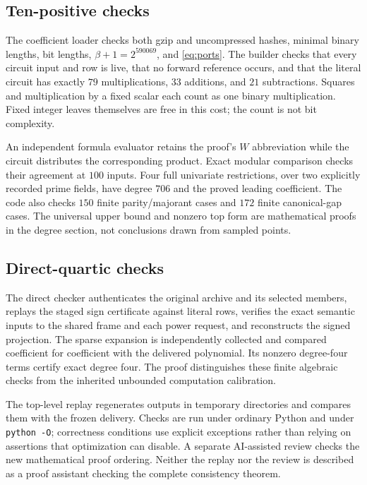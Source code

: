 \documentclass[11pt,letterpaper]{article}
\theoremstyle{definition}
\theoremstyle{remark}
\numberwithin{equation}{section}
\begin{document}
\subsection{Ten-positive checks}

The coefficient loader checks both gzip and uncompressed hashes, minimal
binary lengths, bit lengths, $\beta+1=2^{590069}$, and
\eqref{eq:ports}. The builder checks that every circuit input and row is
live, that no forward reference occurs, and that the literal circuit has
exactly $79$ multiplications, $33$ additions, and $21$ subtractions.
Squares and multiplication by a fixed scalar each count as one binary
multiplication. Fixed integer leaves themselves are free in this cost;
the count is not bit complexity.

An independent formula evaluator retains the proof's $W$ abbreviation
while the circuit distributes the corresponding product. Exact modular
comparison checks their agreement at $100$ inputs. Four full univariate
restrictions, over two explicitly recorded prime fields, have degree
$706$ and the proved leading coefficient. The code also checks $150$
finite parity/majorant cases and $172$ finite canonical-gap cases.
The universal upper bound and nonzero top form are mathematical proofs
in the degree section, not conclusions drawn from sampled points.

\subsection{Direct-quartic checks}

The direct checker authenticates the original archive and its selected
members, replays the staged sign certificate against literal rows,
verifies the exact semantic inputs to the shared frame and each power
request, and reconstructs the signed projection. The sparse expansion is
independently collected and compared coefficient for coefficient with
the delivered polynomial. Its nonzero degree-four terms certify exact
degree four. The proof distinguishes these finite algebraic checks from
the inherited unbounded computation calibration.

The top-level replay regenerates outputs in temporary directories and
compares them with the frozen delivery. Checks are run under ordinary
Python and under \texttt{python -O}; correctness conditions use explicit
exceptions rather than relying on assertions that optimization can
disable. A separate AI-assisted review checks the new mathematical proof
ordering. Neither the replay nor the review is described as a proof
assistant checking the complete consistency theorem.
\end{document}
